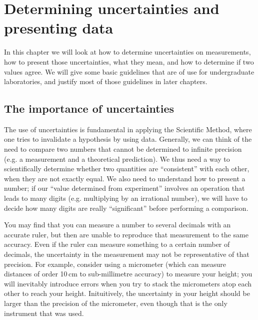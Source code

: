 %
\chapter{Determining uncertainties and presenting data}
\label{chap:Uncertainties}
In this chapter we will look at how to determine uncertainties on measurements, how to present those uncertainties, what they mean, and how to determine if two values agree. We will give some basic guidelines that are of use for undergraduate laboratories, and justify most of those guidelines in later chapters.

\section{The importance of uncertainties}
The use of uncertainties is fundamental in applying the Scientific Method, where one tries to invalidate a hypothesis by using data. Generally, we can think of the need to compare two numbers that cannot be determined to infinite precision (e.g. a measurement and a theoretical prediction). We thus need a way to scientifically determine whether two quantities are ``consistent'' with each other, when they are not exactly equal. We also need to understand how to present a number; if our ``value determined from experiment'' involves an operation that leads to many digits (e.g. multiplying by an irrational number), we will have to decide how many digits are really ``significant'' before performing a comparison.

You may find that you can measure a number to several decimals with an accurate ruler, but then are unable to reproduce that measurement to the same accuracy. Even if the ruler can measure something to a certain number of decimals, the uncertainty in the measurement may not be representative of that precision. For example, consider using a micrometer (which can measure distances of order 10\,cm to sub-millimetre accuracy) to measure your height; you will inevitably introduce errors when you try to stack the micrometers atop each other to reach your height. Inituitively, the uncertainty in your height should be larger than the precision of the micrometer, even though that is the only instrument that was used.
 

